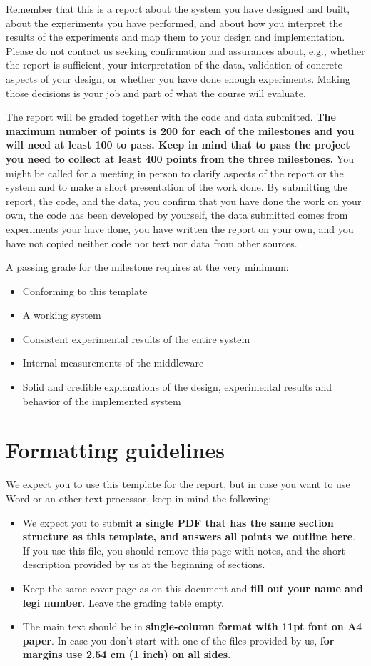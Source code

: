 \documentclass[11pt]{article}
\begin{document}
Remember that this is a report about the system you have designed and built, about the experiments you have performed, and about how you interpret the results of the experiments and map them to your design and implementation. Please do not contact us seeking confirmation and assurances about, e.g., whether the report is sufficient, your interpretation of the data, validation of concrete aspects of your design, or whether you have done enough experiments. Making those decisions is your job and part of what the course will evaluate.

The report will be graded together with the code and data submitted. \textbf{The maximum number of points is 200 for each of the milestones and you will need at least 100 to pass. Keep in mind that to pass the project you need to collect at least 400 points from the three milestones.} You might be called for a meeting in person to clarify aspects of the report or the system and to make a short presentation of the work done. By submitting the report, the code, and the data, you confirm that you have done the work on your own, the code has been developed by yourself, the data submitted comes from experiments your have done, you have written the report on your own, and you have not copied neither code nor text nor data from other sources.

\medskip
\noindent
A passing grade for the milestone requires at the very minimum:
\begin{itemize}
\item Conforming to this template
\item A working system
\item Consistent experimental results of the entire system
\item Internal measurements of the middleware
\item Solid and credible explanations of the design, experimental results and behavior of the implemented system
\end{itemize}

\section*{Formatting guidelines}
We expect you to use this template for the report, but in case you want to use Word or an other text processor, keep in mind the following:
\begin{itemize}
\item  We expect you to submit \textbf{a single PDF that has the same section structure as this template, and answers all points we outline here}. If you use this file, you should remove this page with notes, and the short description provided by us at the beginning of sections.
\item Keep the same cover page as on this document and \textbf{fill out your name and legi number}. Leave the grading table empty.
\item  The main text should be in \textbf{single-column format with 11pt font on A4 paper}. In case you don't start with one of the files provided by us, \textbf{for margins use 2.54 cm (1 inch) on all sides}.
\end{itemize}
\end{document}
